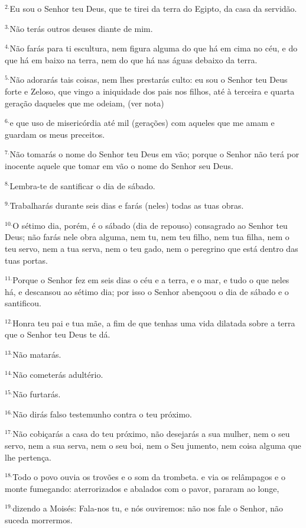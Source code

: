 \documentclass[a4paper,14pt]{extarticle} \usepackage[utf8]{inputenc}
\begin{document}
$^{2.}$Eu sou o Senhor teu Deus, que te tirei da terra do Egipto, da casa da servidão.

$^{3.}$Não terás outros deuses diante de mim.

$^{4.}$Não farás para ti escultura, nem figura alguma do que há em cima no céu, e do que há em baixo na terra, nem do que há nas águas debaixo da terra.

$^{5.}$Não adorarás tais coisas, nem lhes prestarás culto: eu sou o Senhor teu Deus forte e Zeloso, que vingo a iniquidade dos pais nos filhos, até à terceira e quarta geração daqueles que me odeiam, (ver nota)

$^{6.}$e que uso de misericórdia até mil (gerações) com aqueles que me amam e guardam os meus preceitos.

$^{7.}$Não tomarás o nome do Senhor teu Deus em vão; porque o Senhor não terá por inocente aquele que tomar em vão o nome do Senhor seu Deus.

$^{8.}$Lembra-te de santificar o dia de sábado.

$^{9.}$Trabalharás durante seis dias e farás (neles) todas as tuas obras.

$^{10.}$O sétimo dia, porém, é o sábado (dia de repouso) consagrado ao Senhor teu Deus; não farás nele obra alguma, nem tu, nem teu filho, nem tua filha, nem o teu servo, nem a tua serva, nem o teu gado, nem o peregrino que está dentro das tuas portas.

$^{11.}$Porque o Senhor fez em seis dias o céu e a terra, e o mar, e tudo o que neles há, e descansou ao sétimo dia; por isso o Senhor abençoou o dia de sábado e o santificou.

$^{12.}$Honra teu pai e tua mãe, a fim de que tenhas uma vida dilatada sobre a terra que o Senhor teu Deus te dá.

$^{13.}$Não matarás.

$^{14.}$Não cometerás adultério.

$^{15.}$Não furtarás.

$^{16.}$Não dirás falso testemunho contra o teu próximo.

$^{17.}$Não cobiçarás a casa do teu próximo, não desejarás a sua mulher, nem o seu servo, nem a sua serva, nem o seu boi, nem o Seu jumento, nem coisa alguma que lhe pertença.

$^{18.}$Todo o povo ouvia os trovões e o som da trombeta. e via os relâmpagos e o monte fumegando: aterrorizados e abalados com o pavor, pararam ao longe,

$^{19.}$dizendo a Moisés: Fala-nos tu, e nós ouviremos: não nos fale o Senhor, não suceda morrermos.
\end{document}
